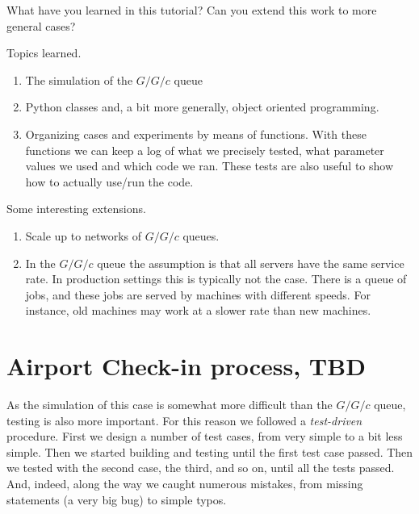 \begin{exercise}
  What have you learned in this tutorial?
 Can you extend this work to more general cases? 
  \begin{solution}
    Topics learned.
    \begin{enumerate}
    \item The simulation of the $G/G/c$ queue
    \item Python classes and, a bit more generally, object oriented programming. 
    \item Organizing cases and experiments by means of  functions. With these functions we can keep a log of what we precisely tested, what parameter values we used and which code we ran. These tests are also useful to show how to actually use/run the code.
    \end{enumerate}

Some  interesting extensions.
    \begin{enumerate}
    \item   Scale up to networks of $G/G/c$ queues.
    \item In the $G/G/c$ queue the assumption is that all servers have the same service rate.
      In production settings this is typically not the case.
      There is a queue of jobs, and these jobs are served by machines with different speeds.
      For instance, old machines may work at a slower rate than new machines.
    \end{enumerate}
  \end{solution}
\end{exercise}


\clearpage


\section{Airport Check-in process, TBD}
\label{sec:simul-check-proc}

As the simulation of this case is somewhat more difficult than the $G/G/c$ queue, testing is also more important. For this reason we followed a \emph{test-driven} procedure. First we design a number of test cases, from very simple to a bit less simple. Then we started building and testing until the first test case passed. Then we tested with the second case, the third, and so on, until all the tests passed. And, indeed, along the way we caught numerous mistakes, from missing  statements (a very big bug) to simple typos.

